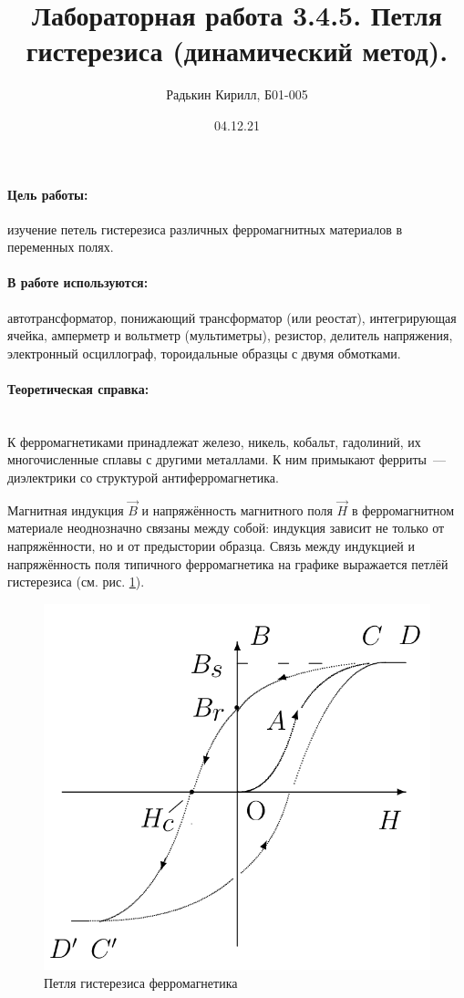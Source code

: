 \documentclass[a4paper, 12pt]{article}
\author{Радькин Кирилл, Б01-005}
\date{04.12.21}
\title{Лабораторная работа 3.4.5. Петля гистерезиса (динамический метод).}
\newcommand{\parag}[1]{\paragraph*{#1:}}
\begin{document}
\maketitle

\parag {Цель работы} изучение петель гистерезиса различных ферромагнитных материалов в переменных полях.

\parag {В работе используются} автотрансформатор, понижающий трансформатор (или реостат), интегрирующая ячейка, амперметр и вольтметр (мультиметры), резистор, делитель напряжения, электронный осциллограф, тороидальные образцы с двумя обмотками.

\parag {Теоретическая справка} ~\\

К ферромагнетиками принадлежат железо, никель, кобальт, гадолиний, их многочисленные сплавы с другими металлами. К ним примыкают ферриты~--- диэлектрики со структурой антиферромагнетика.

Магнитная индукция $\vec{B}$ и напряжённость магнитного поля $\vec{H}$ в ферромагнитном материале неоднозначно связаны между собой: индукция зависит не только от напряжённости, но и от предыстории образца. Связь между индукцией и напряжённость поля типичного ферромагнетика на графике выражается петлёй гистерезиса (см. рис. \ref{gist}).

\begin{figure}[!h]
    \includegraphics[scale = 0.2]{Gist}
    \centering
    \caption{Петля гистерезиса ферромагнетика}
    \label{gist}
\end{figure}
\end{document}
